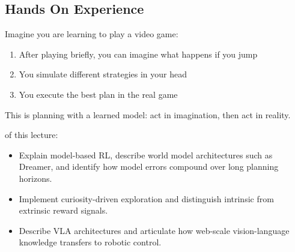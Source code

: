 \subsection{Hands On Experience}

\begin{marginfigure}
\caption{World model predicts next state and reward, enabling mental simulation.}
\label{fig:world_model_intro}
\end{marginfigure}

Imagine you are learning to play a video game:
\begin{enumerate}
    \item After playing briefly, you can imagine what happens if you jump
    \item You simulate different strategies in your head
    \item You execute the best plan in the real game
\end{enumerate}

This is planning with a learned model: act in imagination, then act in reality.

 of this lecture:
\begin{itemize}
    \item Explain model-based RL, describe world model architectures such as Dreamer, and identify how model errors compound over long planning horizons.
    \item Implement curiosity-driven exploration and distinguish intrinsic from extrinsic reward signals.
    \item Describe VLA architectures and articulate how web-scale vision-language knowledge transfers to robotic control.
\end{itemize}


